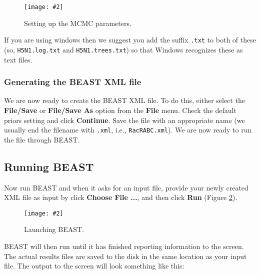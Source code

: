 \documentclass{article}
\newcommand{\includeimage}[2][]{%
\texttt{[image: \#2]}
}
\begin{document}
\begin{figure}
\centering	
\includeimage[scale=0.3]{figures/BEAUti_MCMC}
\caption{Setting up the MCMC parameters.}
\label{fig.MCMC}
\end{figure}


If you are using windows then we suggest you add the suffix \texttt{.txt} to both of these (so,
\texttt{H5N1.log.txt} and \texttt{H5N1.trees.txt}) so that Windows recognizes
these as text files. 



\subsubsection*{Generating the BEAST XML file }

We are now ready to create the BEAST XML file. To do this, either select the {\bf File/Save} or {\bf File/Save As} option from the \textbf{File} menu. Check the default priors setting and click \textbf{Continue}. Save the file with an appropriate name (we usually end the filename with \texttt{.xml}, i.e., \texttt{RacRABC.xml}). We are now ready to run the file through BEAST. 

\subsection*{Running BEAST }

Now run BEAST and when it asks for an input file, provide your newly
created XML file as input by click \textbf{Choose File ...}, and then click \textbf{Run} (Figure \ref{fig.BEAST}). 

\begin{figure}
\centering	
\includeimage[scale=0.4]{figures/BEAST}
\caption{Launching BEAST.}
\label{fig.BEAST} 
\end{figure}


BEAST will then run until it has finished
reporting information to the screen. The actual results files are
saved to the disk in the same location as your input file. The output to the screen will
look something like this: 
\end{document}
